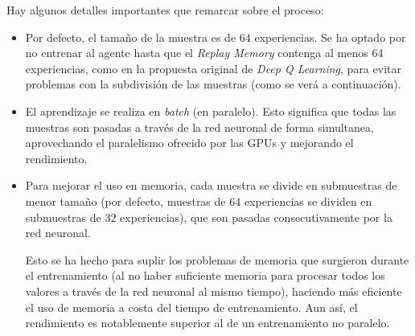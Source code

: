 Hay algunos detalles importantes que remarcar sobre el proceso:
\begin{itemize}
	\item Por defecto, el tamaño de la muestra es de $64$ experiencias. Se ha optado por no entrenar al agente hasta que el \textit{Replay Memory} contenga al menos 64 experiencias, como en la propuesta original de \textit{Deep Q Learning}, para evitar problemas con la subdivisión de las muestras (como se verá a continuación).
	\item El aprendizaje se realiza en \textit{batch} (en paralelo). Esto significa que todas las muestras son pasadas a través de la red neuronal de forma simultanea, aprovechando el paralelismo ofrecido por las GPUs y mejorando el rendimiento.
	\item Para mejorar el uso en memoria, cada muestra se divide en submuestras de menor tamaño (por defecto, muestras de $64$ experiencias se dividen en submuestras de $32$ experiencias), que son pasadas consecutivamente por la red neuronal.
	
	Esto se ha hecho para suplir los problemas de memoria que surgieron durante el entrenamiento (al no haber suficiente memoria para procesar todos los valores a través de la red neuronal al mismo tiempo), haciendo más eficiente el uso de memoria a costa del tiempo de entrenamiento. Aun así, el rendimiento es notablemente superior al de un entrenamiento no paralelo.
\end{itemize}

